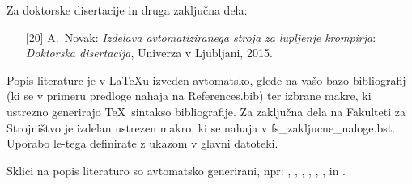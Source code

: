 Za doktorske disertacije in druga zaključna dela:
\begin{itemize}
	\item[{[20]}] A.~Novak: \emph{Izdelava avtomatiziranega stroja za lupljenje krompirja}:
	\emph{Doktorska disertacija}, Univerza v Ljubljani, 2015.
\end{itemize}

Popis literature je v \LaTeX u izveden avtomatsko, glede na vašo bazo bibliografij (ki se v primeru predloge nahaja na References.bib) ter izbrane makre, ki ustrezno generirajo \TeX~sintakso bibliografije. Za zaključna dela na Fakulteti za Strojništvo je izdelan ustrezen makro, ki se nahaja v fs\_zakljucne\_naloge.bst. Uporabo le-tega definirate z ukazom \verb|| v glavni datoteki.

Sklici na popis literaturo so avtomatsko generirani, npr: \cite{bazant_1991}, \cite{Doe_1991},  \cite{Bazant_2008}, \cite{Gonzalez_2014, Bazant_2005} \cite{Bazant_2007, Kogoj_DTD, Merkur_2005, SURS_2009, SURS_2005, MKariera, Encyclopedia, Posl_app, ZGD, ZOP}, \cite{ISO_2573}, \cite{DIN_4768}, \cite{DIN_4768} in \cite{JISB0601, Novak_2015}.








